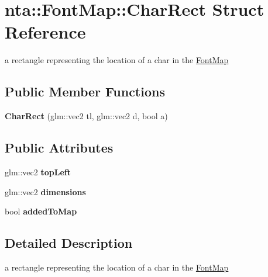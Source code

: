 \hypertarget{structnta_1_1FontMap_1_1CharRect}{}\section{nta\+:\+:Font\+Map\+:\+:Char\+Rect Struct Reference}
\label{structnta_1_1FontMap_1_1CharRect}


a rectangle representing the location of a char in the \hyperlink{classnta_1_1FontMap}{Font\+Map}  


\subsection*{Public Member Functions}
\begin{DoxyCompactItemize}
\item 
\mbox{\label{structnta_1_1FontMap_1_1CharRect_aae578d461eba96e8fbf71f507b99a87f}} 
{\bfseries Char\+Rect} (glm\+::vec2 tl, glm\+::vec2 d, bool a)
\end{DoxyCompactItemize}
\subsection*{Public Attributes}
\begin{DoxyCompactItemize}
\item 
\mbox{\label{structnta_1_1FontMap_1_1CharRect_a84c89136099916d5e825d487fec1fd50}} 
glm\+::vec2 {\bfseries top\+Left}
\item 
\mbox{\label{structnta_1_1FontMap_1_1CharRect_a3f5d24fdc091d334c532274b9a79fd0d}} 
glm\+::vec2 {\bfseries dimensions}
\item 
\mbox{\label{structnta_1_1FontMap_1_1CharRect_a605388f5ce8e4e7316276d9b0df740cb}} 
bool {\bfseries added\+To\+Map}
\end{DoxyCompactItemize}


\subsection{Detailed Description}
a rectangle representing the location of a char in the \hyperlink{classnta_1_1FontMap}{Font\+Map} 


